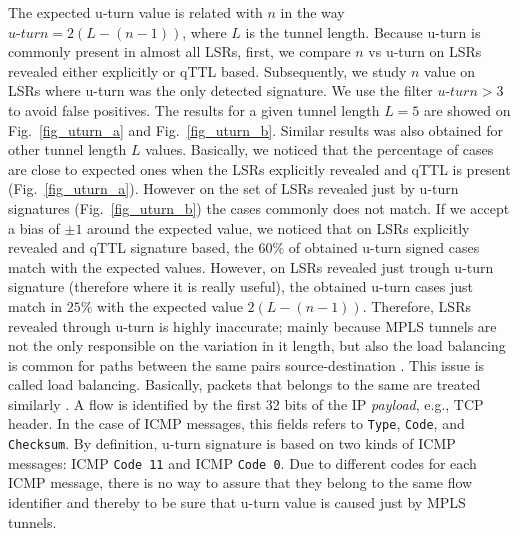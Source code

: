 The expected u-turn value is related with $n$ in the way
$\textit{u-turn}=2(L-(n-1))$, where $L$ is the tunnel length.
Because u-turn is commonly present in almost all LSRs, first, we compare $n$ vs
u-turn on LSRs  revealed either explicitly or qTTL based. Subsequently, we study
$n$ value on LSRs where u-turn was the only detected signature. We use the
filter $\textit{u-turn}>3$ to avoid false positives. The results for a given
tunnel length $L=5$ are showed on Fig.~\ref{fig_uturn_a} and
Fig.~\ref{fig_uturn_b}. Similar results was also obtained for other tunnel
length $L$ values. Basically, we noticed that the percentage of cases are close
to expected ones when the LSRs explicitly revealed  and qTTL is present
(Fig.~\ref{fig_uturn_a}). However on the set of LSRs revealed just by u-turn
signatures (Fig.~\ref{fig_uturn_b}) the cases commonly  does not match. If we
accept a bias of $ \pm 1$ around the expected value, we noticed that  on LSRs
explicitly revealed and qTTL signature based, the $60\%$ of obtained u-turn
signed cases match with the expected values. However, on LSRs revealed just
trough u-turn signature (therefore where it is really useful), the obtained
u-turn cases just match in $25\%$ with the expected value $2(L-(n-1))$.
Therefore, LSRs revealed through u-turn is highly inaccurate; mainly
because MPLS tunnels are not the only responsible on the variation in it length,
but also the load balancing is common for paths between the same pairs
source-destination \cite{BRICE07}. This issue is called  load
balancing. Basically, packets that belongs to the same  are treated
similarly \cite{BRICE06}. A flow is identified by the first 32 bits of
the IP \textit{payload}, e.g., TCP header. In the case of ICMP messages, this
fields refers to \texttt{Type}, \texttt{Code}, and \texttt{Checksum}.
By definition, u-turn signature is based on two kinds of ICMP messages:
ICMP \echoreply \texttt{Code 11} and ICMP \ttlexceeded \texttt{Code 0}.
Due to different codes for each ICMP message, there is no way to assure that
they belong to the same flow identifier and thereby to be sure that
u-turn value is caused just by MPLS tunnels.
